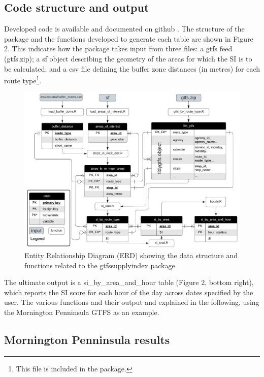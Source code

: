 \documentclass[preprint, 3p,
authoryear]{elsarticle} %
\begin{document}
\hypertarget{code-structure-and-output}{%
\subsection{Code structure and output}\label{code-structure-and-output}}

Developed code is available and documented on github
\citep{gtfssupplyindex_github}. The structure of the package and the
functions developed to generate each table are shown in Figure 2. This
indicates how the package takes input from three files: a gtfs feed
(gtfs.zip); a sf object describing the geometry of the areas for which
the SI is to be calculated; and a csv file defining the buffer zone
distances (in metres) for each route type\footnote{This file is included
  in the package.}.

\begin{figure}
\includegraphics[width=1\linewidth]{graphics/SI_data_structure} \caption{Entity Relationship Diagram (ERD) showing the data structure and functions related to the gtfssupplyindex package}\label{fig:SI_ERD}
\end{figure}

The ultimate output is a si\_by\_area\_and\_hour table (Figure 2, bottom
right), which reports the SI score for each hour of the day across dates
specified by the user. The various functions and their output and
explained in the following, using the Mornington Penninsula GTFS as an
example.

\hypertarget{mornington-penninsula-results}{%
\subsection{Mornington Penninsula
results}\label{mornington-penninsula-results}}
\end{document}
